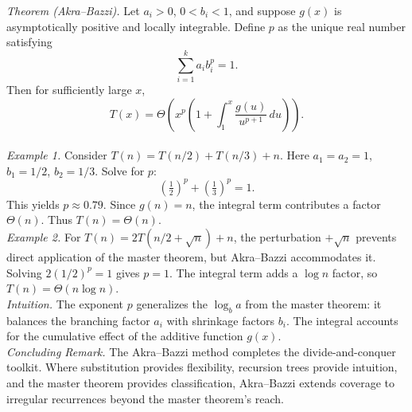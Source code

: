 \documentclass[12pt]{article}
\newcommand{\microhead}[1]{\vspace{0.45em}\noindent\textit{#1}}
\theoremstyle{definition}
\begin{document}
\microhead{Theorem (Akra--Bazzi).}  
Let $a_i > 0$, $0 < b_i < 1$, and suppose $g(x)$ is asymptotically positive and locally integrable. Define $p$ as the unique real number satisfying
\[
\sum_{i=1}^k a_i b_i^p = 1.
\]
Then for sufficiently large $x$,
\[
T(x) = \Theta\!\left( x^p \left( 1 + \int_1^x \frac{g(u)}{u^{p+1}} \, du \right) \right).
\] \\

\microhead{Example 1.} Consider $T(n) = T(n/2) + T(n/3) + n$. Here $a_1=a_2=1$, $b_1=1/2$, $b_2=1/3$. Solve for $p$:
\[
\left(\tfrac{1}{2}\right)^p + \left(\tfrac{1}{3}\right)^p = 1.
\]
This yields $p \approx 0.79$. Since $g(n) = n$, the integral term contributes a factor $\Theta(n)$. Thus $T(n) = \Theta(n)$. \\

\microhead{Example 2.} For $T(n) = 2T(n/2 + \sqrt{n}) + n$, the perturbation $+\sqrt{n}$ prevents direct application of the master theorem, but Akra--Bazzi accommodates it. Solving $2(1/2)^p = 1$ gives $p=1$. The integral term adds a $\log n$ factor, so $T(n) = \Theta(n \log n)$. \\

\microhead{Intuition.} The exponent $p$ generalizes the $\log_b a$ from the master theorem: it balances the branching factor $a_i$ with shrinkage factors $b_i$. The integral accounts for the cumulative effect of the additive function $g(x)$. \\

\microhead{Concluding Remark.} The Akra--Bazzi method completes the divide-and-conquer toolkit. Where substitution provides flexibility, recursion trees provide intuition, and the master theorem provides classification, Akra--Bazzi extends coverage to irregular recurrences beyond the master theorem’s reach. \\
\end{document}

